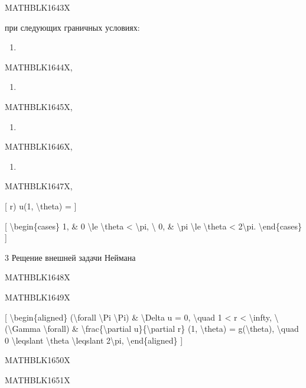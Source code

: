 \documentclass[
]{article}
\providecommand{\tightlist}{%
  \setlength{\itemsep}{0pt}\setlength{\parskip}{0pt}}
\begin{document}
MATHBLK1643X

при следующих граничных условиях:

\begin{enumerate}
\def\labelenumi{\alph{enumi})}
\tightlist
\item
\end{enumerate}

MATHBLK1644X,

\begin{enumerate}
\def\labelenumi{\arabic{enumi})}
\setcounter{enumi}{5}
\tightlist
\item
\end{enumerate}

MATHBLK1645X,

\begin{enumerate}
\def\labelenumi{\Alph{enumi})}
\setcounter{enumi}{1}
\tightlist
\item
\end{enumerate}

MATHBLK1646X,

\begin{enumerate}
\def\labelenumi{\Alph{enumi})}
\setcounter{enumi}{1}
\tightlist
\item
\end{enumerate}

MATHBLK1647X,

{[} r) u(1, \textbackslash theta) = {]}

{[} \textbackslash begin\{cases\} 1, \& 0 \textbackslash le
\textbackslash theta \textless{} \textbackslash pi, \textbackslash{} 0,
\& \textbackslash pi \textbackslash le \textbackslash theta \textless{}
2\textbackslash pi. \textbackslash end\{cases\} {]}

3 Рещение внешней задачи Неймана

MATHBLK1648X

MATHBLK1649X

{[} \textbackslash begin\{aligned\} (\textbackslash forall
\textbackslash Pi \textbackslash Pi) \& \textbackslash Delta u = 0,
\textbackslash quad 1 \textless{} r \textless{} \textbackslash infty,
\textbackslash{} (\textbackslash Gamma \textbackslash forall) \&
\textbackslash frac\{\textbackslash partial u\}\{\textbackslash partial
r\} (1, \textbackslash theta) = g(\textbackslash theta),
\textbackslash quad 0 \textbackslash leqslant \textbackslash theta
\textbackslash leqslant 2\textbackslash pi,
\textbackslash end\{aligned\} {]}

MATHBLK1650X

MATHBLK1651X
\end{document}

